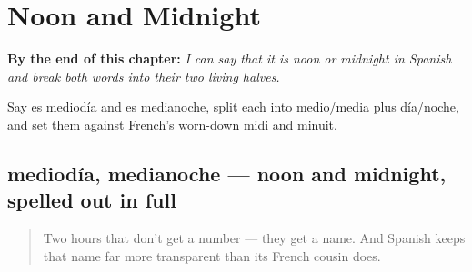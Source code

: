 
\chapter{Noon and Midnight}
\label{ch:spanish-noon-midnight}

\begin{chapteropening}
\textbf{By the end of this chapter:} \emph{I can say that it is noon or midnight in Spanish and break both words into their two living halves.}

Say es mediodía and es medianoche, split each into medio/media plus día/noche, and set them against French's worn-down midi and minuit.
\end{chapteropening}

\section[mediodía, medianoche]{mediodía, medianoche — noon and midnight, spelled out in full}

\label{lesson:ES-C28-mediodia-medianoche}



\begin{quote}
Two hours that don't get a number — they get a name. And Spanish keeps that name far more transparent than its French cousin does.
\end{quote}

